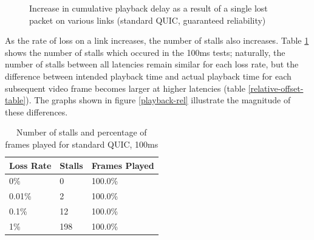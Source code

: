 \documentclass{mpaper}
\begin{document}
\begin{figure}
{   \label{single-150}
 }
 \caption{Increase in cumulative playback delay as a result of a single lost packet on various links (standard QUIC, guaranteed reliability)}
 \label{single-rel}
\end{figure}


As the rate of loss on a link increases, the number of stalls also increases. Table \ref{reliable-stalls} shows the number of stalls which occured in the 100ms tests; naturally, the number of stalls between all latencies remain similar for each loss rate, but the difference between intended playback time and actual playback time for each subsequent video frame becomes larger at higher latencies (table \ref{relative-offset-table}). The graphs shown in figure \ref{playback-rel} illustrate the magnitude of these differences.

\begin{table}[h!]
\centering
\label{stalls-data-rel}
\begin{center}
\begin{tabular}{|p{2cm}|p{2cm}|p{2cm}|}
\hline
Loss Rate & Stalls & Frames Played\\ \hline
0\% & 0 & 100.0\% \\ \hline
0.01\%  & 2 & 100.0\% \\ \hline
0.1\%  & 12 & 100.0\% \\ \hline
1\%  & 198 & 100.0\% \\ \hline

\end{tabular}
\caption{Number of stalls and percentage of frames played for standard QUIC, 100ms}
\label{reliable-stalls}
\end{center}
\end{table}
\end{document}
